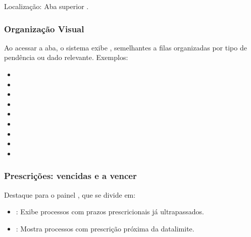 \documentclass[letterpaper,10pt,brazil]{sphinxmanual}
\begin{document}
\sphinxAtStartPar
Localização: Aba superior .


\subsubsection{Organização Visual}
\label{\detokenize{projud_61_acompanhamentoprescricao:organizacao-visual}}
\sphinxAtStartPar
Ao acessar a aba, o sistema exibe , semelhantes a filas organizadas por tipo de pendência ou dado relevante. Exemplos:
\begin{itemize}
\item {} 
\sphinxAtStartPar
{}

\item {} 
\sphinxAtStartPar
{}

\item {} 
\sphinxAtStartPar
{}

\item {} 
\sphinxAtStartPar
{}

\item {} 
\sphinxAtStartPar
{}

\item {} 
\sphinxAtStartPar
{}

\item {} 
\sphinxAtStartPar
{}

\item {} 
\sphinxAtStartPar
{}

\item {} 
\sphinxAtStartPar
{}

\end{itemize}


\subsubsection{Prescrições: vencidas e a vencer}
\label{\detokenize{projud_61_acompanhamentoprescricao:prescricoes-vencidas-e-a-vencer}}
\sphinxAtStartPar
Destaque para o painel , que se divide em:
\begin{itemize}
\item {} 
\sphinxAtStartPar
{}: Exibe processos com prazos prescricionais já ultrapassados.

\item {} 
\sphinxAtStartPar
{}: Mostra processos com prescrição próxima da data\sphinxhyphen{}limite.

\end{itemize}
\end{document}

